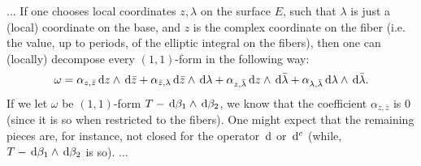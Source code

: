 \documentclass[a4paper,12pt]{article}
\begin{document}
...
If one chooses local coordinates $z, \lambda$ on the surface $E$, such that $\lambda$ is just a (local) coordinate on the base, and $z$ is the complex coordinate on the fiber (i.e. the value, up to periods, of the elliptic integral on the fibers), then one can (locally) decompose every $(1,1)$-form in the following way:
\[
\omega=\alpha_{z,\bar{z}}\,\mathrm d z \wedge \,\mathrm d \bar{z} +\alpha_{\bar{z},\lambda}\,\mathrm d \bar{z} \wedge \,\mathrm d \lambda+\alpha_{z,\bar{\lambda}}\,\mathrm d z \wedge \,\mathrm d \bar{\lambda}+\alpha_{\lambda,\bar{\lambda}}\,\mathrm d \lambda \wedge \,\mathrm d \bar{\lambda}.
\]
If we let $\omega$ be $(1,1)$-form $T- \,\mathrm d \beta_1 \wedge \,\mathrm d \beta_2$, we know that the coefficient $\alpha_{z,\bar{z}}$ is $0$ (since it is so when restricted to the fibers). One might expect that the remaining pieces are, for instance, not closed for the operator $\,\mathrm d$ or $\,\mathrm d^c$ (while, $T- \,\mathrm d \beta_1 \wedge \,\mathrm d \beta_2$ is so).
...




\end{document}

